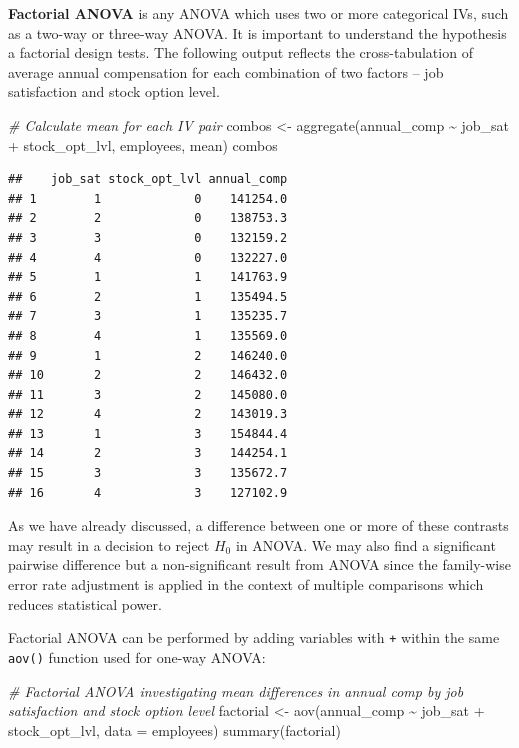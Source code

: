 \documentclass[
]{book}
\newenvironment{Shaded}{\begin{snugshade}}{\end{snugshade}}
\newcommand{\AttributeTok}[1]{\textcolor[rgb]{0.77,0.63,0.00}{#1}}
\newcommand{\CommentTok}[1]{\textcolor[rgb]{0.56,0.35,0.01}{\textit{#1}}}
\newcommand{\FunctionTok}[1]{\textcolor[rgb]{0.00,0.00,0.00}{#1}}
\newcommand{\NormalTok}[1]{#1}
\newcommand{\OtherTok}[1]{\textcolor[rgb]{0.56,0.35,0.01}{#1}}
\newcommand{\SpecialCharTok}[1]{\textcolor[rgb]{0.00,0.00,0.00}{#1}}
\begin{document}
\textbf{Factorial ANOVA} is any ANOVA which uses two or more categorical IVs, such as a two-way or three-way ANOVA. It is important to understand the hypothesis a factorial design tests. The following output reflects the cross-tabulation of average annual compensation for each combination of two factors -- job satisfaction and stock option level.

\begin{Shaded}
\begin{Highlighting}[]
\CommentTok{\# Calculate mean for each IV pair}
\NormalTok{combos }\OtherTok{\textless{}{-}} \FunctionTok{aggregate}\NormalTok{(annual\_comp }\SpecialCharTok{\textasciitilde{}}\NormalTok{ job\_sat }\SpecialCharTok{+}\NormalTok{ stock\_opt\_lvl, employees, mean)}
\NormalTok{combos}
\end{Highlighting}
\end{Shaded}

\begin{verbatim}
##    job_sat stock_opt_lvl annual_comp
## 1        1             0    141254.0
## 2        2             0    138753.3
## 3        3             0    132159.2
## 4        4             0    132227.0
## 5        1             1    141763.9
## 6        2             1    135494.5
## 7        3             1    135235.7
## 8        4             1    135569.0
## 9        1             2    146240.0
## 10       2             2    146432.0
## 11       3             2    145080.0
## 12       4             2    143019.3
## 13       1             3    154844.4
## 14       2             3    144254.1
## 15       3             3    135672.7
## 16       4             3    127102.9
\end{verbatim}

As we have already discussed, a difference between one or more of these contrasts may result in a decision to reject \(H_0\) in ANOVA. We may also find a significant pairwise difference but a non-significant result from ANOVA since the family-wise error rate adjustment is applied in the context of multiple comparisons which reduces statistical power.

Factorial ANOVA can be performed by adding variables with \texttt{+} within the same \texttt{aov()} function used for one-way ANOVA:

\begin{Shaded}
\begin{Highlighting}[]
\CommentTok{\# Factorial ANOVA investigating mean differences in annual comp by job satisfaction and stock option level}
\NormalTok{factorial }\OtherTok{\textless{}{-}} \FunctionTok{aov}\NormalTok{(annual\_comp }\SpecialCharTok{\textasciitilde{}}\NormalTok{ job\_sat }\SpecialCharTok{+}\NormalTok{ stock\_opt\_lvl, }\AttributeTok{data =}\NormalTok{ employees)}
\FunctionTok{summary}\NormalTok{(factorial)}
\end{Highlighting}
\end{Shaded}
\end{document}
